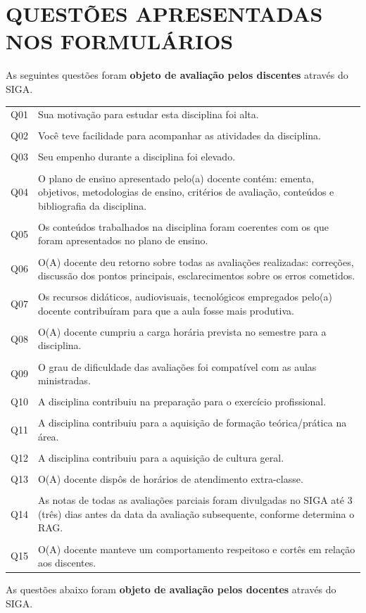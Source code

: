 \documentclass[a4paper,10pt]{article}
\begin{document}
\section{QUESTÕES APRESENTADAS NOS FORMULÁRIOS}
As seguintes questões foram {\bf objeto de avaliação pelos discentes} através do SIGA.

\begin{center}
\small{
\begin{tabularx}{\linewidth}{l|X}
Q01&Sua motivação para estudar esta disciplina foi alta.\\\\
Q02&Você teve facilidade para acompanhar as atividades da disciplina.\\\\
Q03&Seu empenho durante a disciplina foi elevado.\\\\
Q04&O plano de ensino apresentado pelo(a) docente contém: ementa, objetivos, metodologias de ensino, critérios de avaliação, conteúdos e bibliografia da disciplina.\\\\
Q05&Os conteúdos trabalhados na disciplina foram coerentes com os que foram apresentados no plano de ensino.\\\\
Q06&O(A) docente deu retorno sobre todas as avaliações realizadas: correções, discussão dos pontos principais, esclarecimentos sobre os erros cometidos.\\\\
Q07&Os recursos didáticos, audiovisuais, tecnológicos empregados pelo(a) docente contribuíram para que a aula fosse mais produtiva.\\\\
Q08&O(A) docente cumpriu a carga horária prevista no semestre para a disciplina.\\\\
Q09&O grau de dificuldade das avaliações foi compatível com as aulas ministradas.\\\\
Q10&A disciplina contribuiu na preparação para o exercício profissional.\\\\
Q11&A disciplina contribuiu para a aquisição de formação teórica/prática na área. \\\\
Q12&A disciplina contribuiu para a aquisição de cultura geral.\\\\
Q13&O(A) docente dispôs de horários de atendimento extra-classe.\\\\
Q14& As notas de todas as avaliações parciais foram divulgadas no SIGA até 3 (três) dias antes da data da avaliação subsequente, conforme determina o RAG. \\\\
Q15&O(A) docente manteve um comportamento respeitoso e cortês em relação aos discentes.
\end{tabularx}
}
\end{center}
As questões abaixo foram {\bf objeto de avaliação pelos docentes} através do SIGA.
\end{document}
